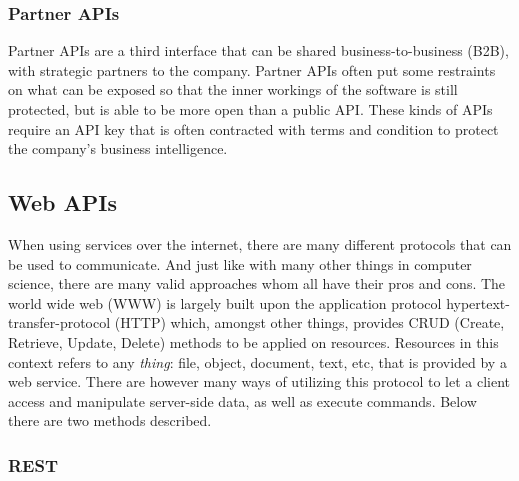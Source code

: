 \documentclass{cslthse-msc}
\begin{document}
    \subsubsection{Partner APIs}
    Partner APIs are a third interface that can be shared
    business-to-business (B2B), with strategic partners to the company.
    Partner APIs often put some restraints on what can be exposed so that
    the inner workings of the software is still protected, but is able to be
    more open than a public API. These kinds of APIs require an API key that
    is often contracted with terms and condition to protect the company's
    business intelligence.\citet{levin}

    \subsection{Web APIs}

    When using services over the internet, there are many different protocols that can be used to communicate.
    And just like with many other things in computer science, there are many valid approaches whom all have their
    pros and cons. The world wide web (WWW) is largely built upon the application protocol
    hypertext-transfer-protocol (HTTP) which, amongst other things, provides CRUD (Create, Retrieve, Update, Delete)
    methods to be applied on resources. Resources in this context refers to any \textit{thing}: file, object, document,
    text, etc, that is provided by a web service. There are however many ways of utilizing this protocol to let a
    client access and manipulate server-side data, as well as execute commands. Below there are two methods described.

    \subsubsection{REST}
\end{document}
